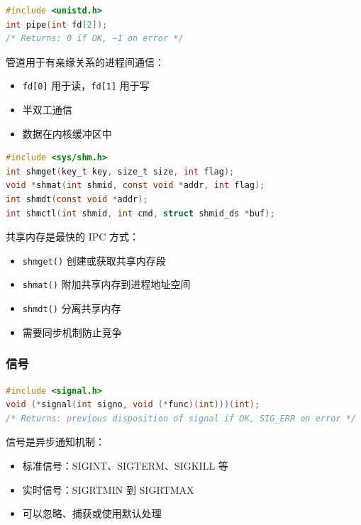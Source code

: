 \begin{lstlisting}[language=C]
#include <unistd.h>
int pipe(int fd[2]);
/* Returns: 0 if OK, −1 on error */
\end{lstlisting}

管道用于有亲缘关系的进程间通信：
\begin{itemize}
  \item \texttt{fd[0]} 用于读，\texttt{fd[1]} 用于写
  \item 半双工通信
  \item 数据在内核缓冲区中
\end{itemize}


\begin{lstlisting}[language=C]
#include <sys/shm.h>
int shmget(key_t key, size_t size, int flag);
void *shmat(int shmid, const void *addr, int flag);
int shmdt(const void *addr);
int shmctl(int shmid, int cmd, struct shmid_ds *buf);
\end{lstlisting}

共享内存是最快的 IPC 方式：
\begin{itemize}
  \item \texttt{shmget()} 创建或获取共享内存段
  \item \texttt{shmat()} 附加共享内存到进程地址空间
  \item \texttt{shmdt()} 分离共享内存
  \item 需要同步机制防止竞争
\end{itemize}

\subsubsection{信号}


\begin{lstlisting}[language=C]
#include <signal.h>
void (*signal(int signo, void (*func)(int)))(int);
/* Returns: previous disposition of signal if OK, SIG_ERR on error */
\end{lstlisting}

信号是异步通知机制：
\begin{itemize}
  \item 标准信号：SIGINT、SIGTERM、SIGKILL 等
  \item 实时信号：SIGRTMIN 到 SIGRTMAX
  \item 可以忽略、捕获或使用默认处理
\end{itemize}



